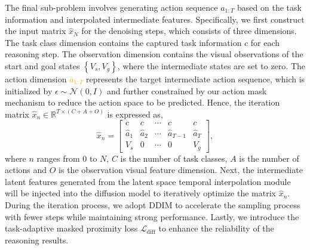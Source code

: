 The final sub-problem involves generating action sequence $a_{1:T}$ based on the task information and interpolated intermediate features. 
Specifically, we first construct the input matrix $\hat{x}_N$ for the denoising steps, which consists of three dimensions. 
The task class dimension contains the captured task information $c$ for each reasoning step.
The observation dimension contains the visual observations of the start and goal states $\left\{ {V_s, V_g} \right\}$, where the intermediate states are set to zero. 
The action dimension \textcolor{orange}{$\bar{a}_{1:T}$} represents the target intermediate action sequence, which is initialized by $\epsilon \sim \mathcal{N}(0, I)$ and further constrained by our action mask mechanism to reduce the action space to be predicted.
Hence, the iteration matrix $\hat{x}_n \in \mathbb{R}^{ T \times (C+A+O)  }$ is expressed as, 
\begin{equation}
    \hat{x}_n = \begin{bmatrix}  
        c & c & \cdots & c & c \\  
        \hat{a}_1 & \hat{a}_2 & \cdots & \hat{a}_{T-1} & \hat{a}_T \\  
        V_s & 0 & \cdots & 0 & V_g
    \end{bmatrix},
\end{equation}
where $n$ ranges from 0 to $N$, $C$ is the number of task classes, $A$ is the number of actions and $O$ is the observation visual feature dimension. Next, the intermediate latent features generated from the latent space temporal interpolation module will be injected into the diffusion model to iteratively optimize the matrix $\hat{x}_n$. 
During the iteration process, we adopt DDIM to accelerate the sampling process with fewer steps while maintaining strong performance. 
Lastly, we introduce the task-adaptive masked proximity loss $\mathcal{L}_{\mathrm{diff}}$ to enhance the reliability of the reasoning results.


